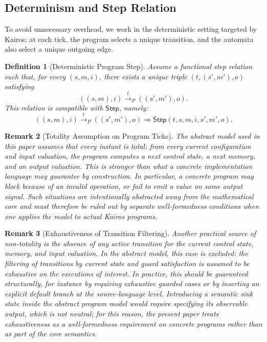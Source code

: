 \documentclass[11pt,a4paper]{article}
\newtheorem{definition}{Definition}[section]
\newtheorem{remark}[definition]{Remark}
\newcommand{\StepRel}{\mathsf{Step}}
\begin{document}
\subsection{Determinism and Step Relation}

To avoid unnecessary overhead, we work in the deterministic setting targeted by
Kairos: at each tick, the program selects a unique transition, and the automata
also select a unique outgoing edge.

\begin{definition}[Deterministic Program Step]
Assume a functional step relation such that, for every
\((s,m,i)\), there exists a unique triple \((t,(s',m'),o)\) satisfying
\[
((s,m),i)\xrightarrow{\,t\,}_P((s',m'),o).
\]
This relation is compatible with \(\StepRel\), namely:
\[
((s,m),i)\xrightarrow{\,t\,}_P((s',m'),o)
\Longrightarrow
\StepRel(t,s,m,i,s',m',o).
\]
\end{definition}

\begin{remark}[Totality Assumption on Program Ticks]
The abstract model used in this paper assumes that every instant is total: from
every current configuration and input valuation, the program computes a next
control state, a next memory, and an output valuation. This is stronger than
what a concrete implementation language may guarantee by construction. In
particular, a concrete program may block because of an invalid operation, or
fail to emit a value on some output signal. Such situations are intentionally
abstracted away from the mathematical core and must therefore be ruled out by
separate well-formedness conditions when one applies the model to actual Kairos
programs.
\end{remark}

\begin{remark}[Exhaustiveness of Transition Filtering]
Another practical source of non-totality is the absence of any active
transition for the current control state, memory, and input valuation. In the
abstract model, this case is excluded: the filtering of transitions by current
state and guard satisfaction is assumed to be exhaustive on the executions of
interest. In practice, this should be guaranteed structurally, for instance by
requiring exhaustive guarded cases or by inserting an explicit default branch
at the source-language level. Introducing a semantic sink state inside the
abstract program model would require specifying its observable output, which is
not neutral; for this reason, the present paper treats exhaustiveness as a
well-formedness requirement on concrete programs rather than as part of the
core semantics.
\end{remark}
\end{document}
